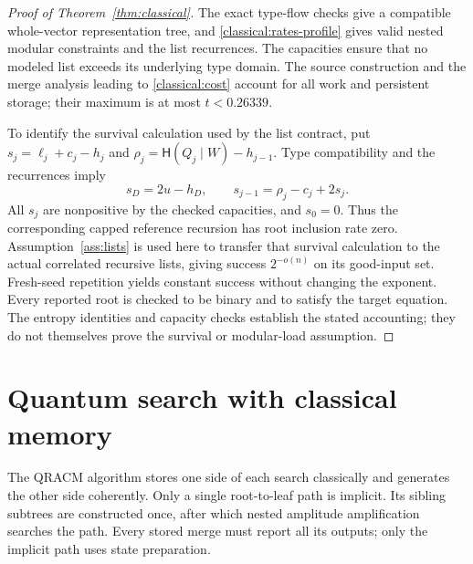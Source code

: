 \documentclass[10pt,a4paper]{article}
\theoremstyle{definition}
\newcommand{\HH}{\mathsf H}
\begin{document}
\begin{proof}[Proof of Theorem~\ref{thm:classical}]
The exact type-flow checks give a compatible whole-vector representation
tree, and \eqref{classical:rates-profile} gives valid nested modular
constraints and the list recurrences. The capacities ensure that no
modeled list exceeds its underlying type domain. The source construction
and the merge analysis leading to \eqref{classical:cost} account for all
work and persistent storage; their maximum is at most
$t<0.26339$.

To identify the survival calculation used by the list contract, put
$s_j=\ell_j+c_j-h_j$ and
$\rho_j=\HH(Q_j\mid W)-h_{j-1}$. Type compatibility and the recurrences
imply
\[
 s_D=2u-h_D,\qquad s_{j-1}=\rho_j-c_j+2s_j.
\]
All $s_j$ are nonpositive by the checked capacities, and $s_0=0$.
Thus the corresponding capped reference recursion has root inclusion
rate zero. Assumption~\ref{ass:lists} is used here to transfer that
survival calculation to the actual correlated recursive lists, giving
success $2^{-o(n)}$ on its good-input set. Fresh-seed repetition yields
constant success without changing the exponent. Every reported root is
checked to be binary and to satisfy the target equation. The entropy
identities and capacity checks establish the stated accounting; they do
not themselves prove the survival or modular-load assumption.
\end{proof}



\section{Quantum search with classical memory}
\label{sec:qracm}

The QRACM algorithm stores one side of each search classically and
generates the other side coherently.  Only a single root-to-leaf path is
implicit.  Its sibling subtrees are constructed once, after which nested
amplitude amplification searches the path.  Every stored merge must
report all its outputs; only the implicit path uses state preparation.
\end{document}

